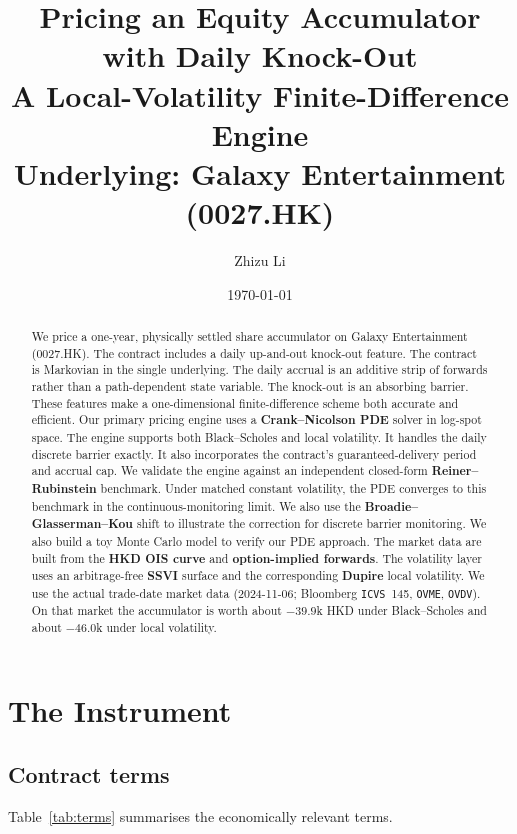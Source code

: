 \documentclass[11pt]{article}
\title{\vspace{-1.5em}\textbf{Pricing an Equity Accumulator with Daily Knock-Out}\\[0.3em]
\large A Local-Volatility Finite-Difference Engine\\[0.2em]
\normalsize Underlying: Galaxy Entertainment (0027.HK)}
\author{Zhizu Li}
\date{\today}
\begin{document}
\maketitle
\vspace{-1em}

\begin{abstract}
\noindent
We price a one-year, physically settled share accumulator on Galaxy Entertainment (0027.HK). The contract includes a daily up-and-out knock-out feature. The contract is Markovian in the single underlying. The daily accrual is an additive strip of forwards rather than a path-dependent state variable. The knock-out is an absorbing barrier. These features make a one-dimensional finite-difference scheme both accurate and efficient. Our primary pricing engine uses a
\textbf{Crank--Nicolson PDE} solver in log-spot space. The engine supports both Black--Scholes and
local volatility. It handles the daily discrete barrier exactly. It also incorporates the contract’s guaranteed-delivery period and accrual cap. We validate the engine against an independent closed-form \textbf{Reiner--Rubinstein} benchmark. Under matched constant volatility, the PDE converges to this benchmark in the continuous-monitoring limit. We also use the
\textbf{Broadie--Glasserman--Kou} shift to illustrate the correction for discrete barrier monitoring. We also build a toy Monte Carlo model to verify our PDE approach. The market data are built from the
\textbf{HKD OIS curve} and
\textbf{option-implied forwards}. The volatility layer uses an arbitrage-free \textbf{SSVI}
surface and the corresponding \textbf{Dupire} local volatility. We use the actual trade-date market
data (2024-11-06; Bloomberg \texttt{ICVS}~145, \texttt{OVME}, \texttt{OVDV}). On that market the
accumulator is worth about $-39.9$k HKD under Black--Scholes and about $-46.0$k under local
volatility.
\end{abstract}

\tableofcontents
\bigskip

\section{The Instrument}\label{sec:instrument}

\subsection{Contract terms}
Table~\ref{tab:terms} summarises the economically relevant terms.
\end{document}
